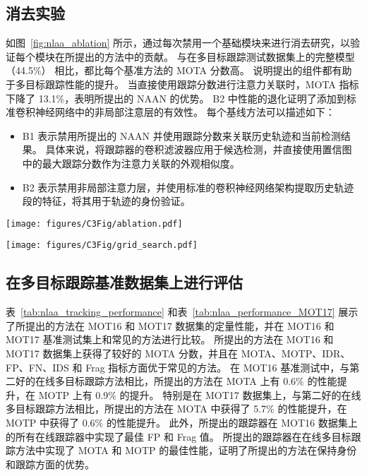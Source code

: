 \subsection{消去实验}
如图~\ref{fig:nlaa_ablation} 所示，通过每次禁用一个基础模块来进行消去研究，以验证每个模块在所提出的方法中的贡献。
与在多目标跟踪测试数据集上的完整模型（44.5$\%$） 相比，都比每个基准方法的 MOTA 分数高。 
说明提出的组件都有助于多目标跟踪性能的提升。
当直接使用跟踪分数进行注意力关联时，MOTA 指标下降了 13.1$\%$，表明所提出的 NAAN 的优势。
B2 中性能的退化证明了添加到标准卷积神经网络中的非局部注意层的有效性。 
每个基线方法可以描述如下：

\begin{itemize}
	\item  B1 表示禁用所提出的 NAAN 并使用跟踪分数来关联历史轨迹和当前检测结果。 
	具体来说，将跟踪器的卷积滤波器应用于候选检测，并直接使用置信图中的最大跟踪分数作为注意力关联的外观相似度。
	\item  B2 表示禁用非局部注意力层，并使用标准的卷积神经网络架构提取历史轨迹段的特征，将其用于轨迹的身份验证。
\end{itemize}


\begin{figure*}[ht]
	\centering
	\texttt{[image: figures/C3Fig/ablation.pdf]}
	\caption{消去实验结果}
	\label{fig:nlaa_ablation}
\end{figure*}


\begin{figure*}[ht]
	\centering
	\texttt{[image: figures/C3Fig/grid\_search.pdf]}
	\caption{网格搜索超参数}
	\label{fig:nlaa_grid_search}
\end{figure*}


\subsection{在多目标跟踪基准数据集上进行评估}
表~\ref{tab:nlaa_tracking_performance} 和表~\ref{tab:nlaa_performance_MOT17} 展示了所提出的方法在 MOT16 和 MOT17 数据集的定量性能，并在 MOT16 和 MOT17 基准测试集上和常见的方法进行比较。 
所提出的方法在 MOT16 和 MOT17 数据集上获得了较好的 MOTA 分数，并且在 MOTA、MOTP、IDR、FP、FN、IDS 和 Frag 指标方面优于常见的方法。 
在 MOT16 基准测试中，与第二好的在线多目标跟踪方法相比，所提出的方法在 MOTA 上有 0.6$\%$ 的性能提升，在 MOTP 上有 0.9$\%$ 的提升。 
特别是在 MOT17 数据集上，与第二好的在线多目标跟踪方法相比，所提出的方法在 MOTA 中获得了 5.7$\%$ 的性能提升，在 MOTP 中获得了 0.6$\%$ 的性能提升。 
此外，所提出的跟踪器在 MOT16 数据集上的所有在线跟踪器中实现了最佳 FP 和 Frag 值。
所提出的跟踪器在在线多目标跟踪方法中实现了 MOTA 和 MOTP 的最佳性能，证明了所提出的方法在保持身份和跟踪方面的优势。 


